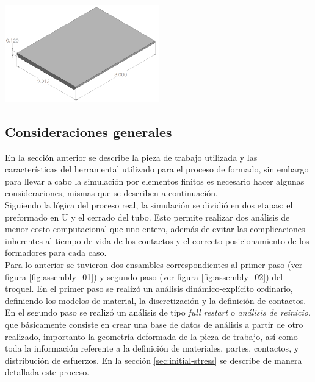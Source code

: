 \begin{center}
\includegraphics[width=0.5\textwidth]{src/ch3/blank.png}
\label{fig:blank_inicial}
\end{center}

\subsection{Consideraciones generales}\label{sec:consideraciones-generales}

En la sección anterior se describe la pieza de trabajo utilizada y las características del herramental 
utilizado para el proceso de formado, sin embargo para llevar a cabo la simulación por elementos 
finitos es necesario hacer algunas consideraciones, mismas que se describen a continuación.\\

Siguiendo la lógica del proceso real, la simulación se dividió en dos etapas: el preformado en U y 
el cerrado del tubo. Esto permite realizar dos análisis de menor costo computacional que uno entero, 
además de evitar las complicaciones inherentes al tiempo de vida de los contactos y el correcto 
posicionamiento de los formadores para cada caso.\\

Para lo anterior se tuvieron dos ensambles correspondientes al primer paso (ver figura \ref{fig:assembly_01}) y 
segundo paso (ver figura \ref{fig:assembly_02}) del troquel. En el primer paso se realizó 
un análisis dinámico-explícito ordinario, definiendo los modelos de material, la discretización y 
la definición de contactos. En el segundo paso se realizó un análisis de tipo \textit{full restart} o 
\textit{análisis de reinicio}, que básicamente consiste en crear una base de datos de análisis a 
partir de otro realizado, importanto la geometría deformada de la pieza de trabajo, así como toda 
la información referente a la definición de materiales, partes, contactos, y distribución de esfuerzos. 
En la sección \ref{sec:initial-stress} se describe de manera detallada este proceso. \\

